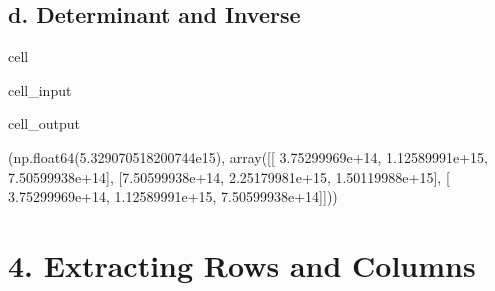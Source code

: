 \documentclass[letterpaper,10pt,english]{jupyterBook}
\begin{document}
\subsection{d. Determinant and Inverse}
\label{\detokenize{lessons/Intro_to_Matrices_in_NumPy:d-determinant-and-inverse}}
\begin{sphinxuseclass}{cell}\begin{sphinxVerbatimInput}

\begin{sphinxuseclass}{cell_input}
\begin{sphinxVerbatim}[commandchars=\\\{\}]
  

        

 
\end{sphinxVerbatim}

\end{sphinxuseclass}\end{sphinxVerbatimInput}
\begin{sphinxVerbatimOutput}

\begin{sphinxuseclass}{cell_output}
\begin{sphinxVerbatim}[commandchars=\\\{\}]
(np.float64(\PYGZhy{}5.329070518200744e\PYGZhy{}15),
 array([[ 3.75299969e+14, \PYGZhy{}1.12589991e+15,  7.50599938e+14],
        [\PYGZhy{}7.50599938e+14,  2.25179981e+15, \PYGZhy{}1.50119988e+15],
        [ 3.75299969e+14, \PYGZhy{}1.12589991e+15,  7.50599938e+14]]))
\end{sphinxVerbatim}

\end{sphinxuseclass}\end{sphinxVerbatimOutput}

\end{sphinxuseclass}

\section{4. Extracting Rows and Columns}
\label{\detokenize{lessons/Intro_to_Matrices_in_NumPy:extracting-rows-and-columns}}
\end{document}
